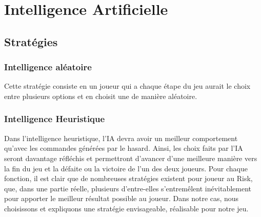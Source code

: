 \section{Intelligence Artificielle}

\subsection{Stratégies}

\subsubsection{Intelligence aléatoire}
Cette stratégie consiste en un joueur qui a chaque étape du jeu aurait le choix entre plusieurs options et en choisit une de manière aléatoire.

\subsubsection{Intelligence Heuristique}
Dans l'intelligence heuristique, l'IA devra avoir un meilleur comportement qu'avec les commandes générées par le hasard. Ainsi, les choix faits par l'IA seront davantage réfléchis et permettront d'avancer d'une meilleure manière vers la fin du jeu et la défaite ou la victoire de l'un des deux joueurs. 
Pour chaque fonction, il est clair que de nombreuses stratégies existent pour joueur au Risk, que, dans une partie réelle, plusieurs d'entre-elles s'entremêlent inévitablement pour apporter le meilleur résultat possible au joueur. Dans notre cas, nous choisissons et expliquons une stratégie envisageable, réalisable pour notre jeu.
\newline


